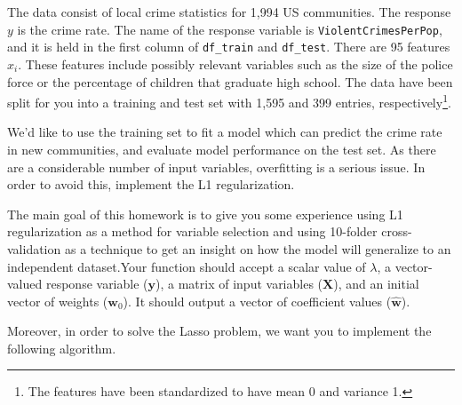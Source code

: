 \documentclass[10pt]{article}
\renewcommand{\mathbf}{\boldsymbol}
\begin{document}
The data consist of local crime statistics for 1,994 US communities. The response $y$ is the crime rate. The name of the response variable is \texttt{ViolentCrimesPerPop}, and it is held in the first column of \texttt{df\_train} and \texttt{df\_test}. There are 95 features $x_i$. These features include possibly relevant variables such as the size of the police force or the percentage of children that graduate high school. The data have been split for you into a training and test set with 1,595 and 399 entries, respectively\footnote{The features have been standardized to have mean 0 and variance 1.}.

We'd like to use the training set to fit a model which can predict the crime rate in new communities, and evaluate model performance on the test set. As there are a considerable number of input variables, overfitting is a serious issue. In order to avoid this, implement the L1 regularization. 


The main goal of this homework is to give you some experience using L1 regularization as a method for variable selection and using 10-folder cross-validation as a technique to get an insight on how the model will generalize to an independent dataset.Your function should accept a scalar value of $\lambda$, a vector-valued response variable ($\mathbf{y}$), a matrix of input variables ($\mathbf{X}$), and an initial vector of weights ($\mathbf{w}_0$). It should output a vector of coefficient values ($\hat{\mathbf{w}}$).

Moreover, in order to solve the Lasso problem, we want you to implement the following algorithm. 
\end{document}
